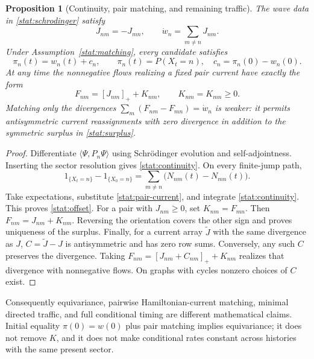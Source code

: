 \documentclass[11pt,oneside,openany]{book}
\newtheorem{proposition}[theorem]{Proposition}
\theoremstyle{definition}
\theoremstyle{remark}\newtheorem{remark}[theorem]{Remark}
\begin{document}
\begin{proposition}[Continuity, pair matching, and remaining traffic]
\label{stat:traffic-family}
The wave data in \eqref{stat:schrodinger} satisfy
\begin{equation}\label{stat:continuity}
 J_{nm}=-J_{mn},\qquad \dot w_n=\sum_{m\ne n}J_{nm}.
\end{equation}
Under Assumption~\ref{stat:matching}, every candidate satisfies
\begin{equation}\label{stat:offset}
 \pi_n(t)=w_n(t)+c_n,
 \qquad \pi_n(t)=P(X_t=n),\quad c_n=\pi_n(0)-w_n(0).
\end{equation}
At any time the nonnegative flows realizing a fixed pair current have
exactly the form
\begin{equation}\label{stat:surplus}
 F_{nm}=[J_{nm}]_++K_{nm},\qquad
 K_{nm}=K_{mn}\geq0.
\end{equation}
Matching only the divergences $\sum_m(F_{nm}-F_{mn})=\dot w_n$ is weaker:
it permits antisymmetric current reassignments with zero divergence in
addition to the symmetric surplus in \eqref{stat:surplus}.
\end{proposition}
\begin{proof}
Differentiate $\langle\Psi,P_n\Psi\rangle$ using Schr\"odinger evolution and
self-adjointness. Inserting the sector resolution gives
\eqref{stat:continuity}. On every finite-jump path,
\[
 1_{\{X_t=n\}}-1_{\{X_0=n\}}
   =\sum_{m\ne n}\bigl(N_{nm}(t)-N_{mn}(t)\bigr).
\]
Take expectations, substitute \eqref{stat:pair-current}, and integrate
\eqref{stat:continuity}. This proves \eqref{stat:offset}. For a pair with
$J_{nm}\geq0$, set $K_{nm}=F_{mn}$. Then $F_{nm}=J_{nm}+K_{nm}$. Reversing
the orientation covers the other sign and proves uniqueness of the surplus.
Finally, for a current array $\widetilde J$ with the same divergence as $J$,
$C=\widetilde J-J$ is antisymmetric and has zero row sums. Conversely, any
such $C$ preserves the divergence. Taking
$F_{nm}=[J_{nm}+C_{nm}]_++K_{nm}$ realizes that divergence with nonnegative
flows. On graphs with cycles nonzero choices of $C$ exist.
\end{proof}

Consequently equivariance, pairwise Hamiltonian-current matching, minimal
directed traffic, and full conditional timing are different mathematical
claims. Initial equality $\pi(0)=w(0)$ plus pair matching implies equivariance;
it does not remove $K$, and it does not make conditional rates constant
across histories with the same present sector.
\end{document}
